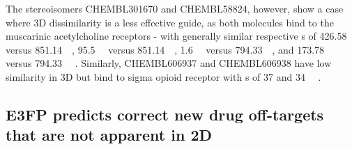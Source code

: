 \documentclass[../main.tex]{subfiles}
\begin{document}
\begin{refsection}
The stereoisomers CHEMBL301670 and  CHEMBL58824, however, show a case where 3D dissimilarity is a less effective guide, as both molecules bind to the muscarinic acetylcholine receptors - with generally similar respective \ICfifty s of \SI{426.58}{\nano\molar} versus \SI{851.14}{\nano\molar},  \SI{95.5}{\nano\molar} versus \SI{851.14}{\nano\molar}, \SI{1.6}{\micro\molar} versus \SI{794.33}{\nano\molar}, and \SI{173.78}{\nano\molar} versus  \SI{794.33}{\nano\molar} \cite{gao_2002}.
Similarly,  CHEMBL606937 and CHEMBL606938 have low similarity in 3D but bind to sigma opioid receptor with \ICfifty s of 37 and \SI{34}{\nano\molar} \cite{decosta_1990}.

\subsection*{E3FP predicts correct new drug off-targets that are not apparent in 2D}


\end{refsection}
\end{document}
